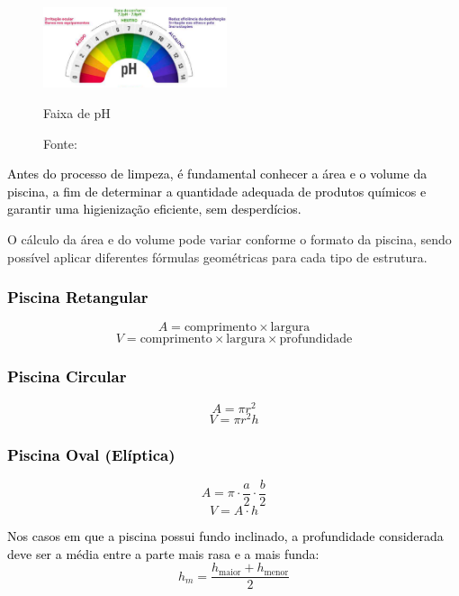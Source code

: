         \begin{figure}[H]
                \centering
                \caption{ }  
            	\centering
                \label{fig:cont}
            	\includegraphics[width=0.48\textwidth]{imagens/medidorPh.png}
                \caption*{Faixa de pH}
            	\caption*{Fonte: \cite{guiaTratamento}}
        \end{figure}


        \textcolor{black}{Antes do processo de limpeza, é fundamental conhecer a área e o volume da piscina, a fim de determinar a quantidade adequada de produtos químicos e garantir uma higienização eficiente, sem desperdícios.}

        O cálculo da área e do volume pode variar conforme o formato da piscina, sendo possível aplicar diferentes fórmulas geométricas para cada tipo de estrutura.

        \subsubsection*{\textcolor{black}{Piscina Retangular}}
        
            \[
            A = \text{comprimento} \times \text{largura}
            \]
            \[
            V = \text{comprimento} \times \text{largura} \times \text{profundidade}
            \]
            
        \subsubsection*{\textcolor{black}{Piscina Circular}}
            \[
            A = \pi r^2
            \]
            \[
            V = \pi r^2 h
            \]
            
        \subsubsection*{\textcolor{black}{Piscina Oval (Elíptica)}}
            \[
            A = \pi \cdot \frac{a}{2} \cdot \frac{b}{2}
            \]
            \[
            V = A \cdot h
            \]
            
            \textcolor{black}{Nos casos em que a piscina possui fundo inclinado, a profundidade considerada deve ser a média entre a parte mais rasa e a mais funda:}
            \[
            h_m = \frac{h_{\text{maior}} + h_{\text{menor}}}{2}
            \]
            


